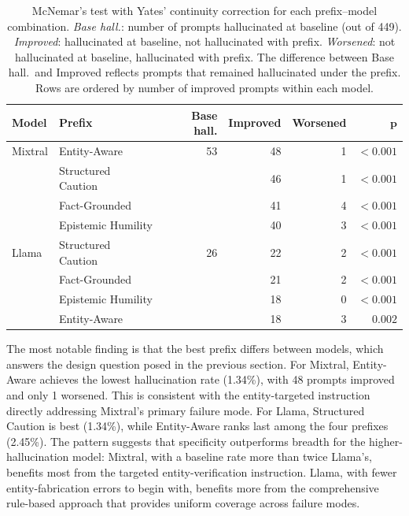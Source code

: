 \begin{table}[ht]
\centering
\small
\begin{tabular}{ll rrrr}
\toprule
\textbf{Model} & \textbf{Prefix} & \textbf{Base hall.} & \textbf{Improved} & \textbf{Worsened} & $\boldsymbol{p}$ \\
\midrule
Mixtral & Entity-Aware       & 53 & 48 & 1 & $< 0.001$ \\
        & Structured Caution &    & 46 & 1 & $< 0.001$ \\
        & Fact-Grounded      &    & 41 & 4 & $< 0.001$ \\
        & Epistemic Humility &    & 40 & 3 & $< 0.001$ \\[3pt]
Llama   & Structured Caution & 26 & 22 & 2 & $< 0.001$ \\
        & Fact-Grounded      &    & 21 & 2 & $< 0.001$ \\
        & Epistemic Humility &    & 18 & 0 & $< 0.001$ \\
        & Entity-Aware       &    & 18 & 3 & $0.002$ \\
\bottomrule
\end{tabular}
\caption[McNemar's test results for the pilot study]{McNemar's test with Yates' continuity correction for each prefix--model combination.  \emph{Base hall.}: number of prompts hallucinated at baseline (out of 449).  \emph{Improved}: hallucinated at baseline, not hallucinated with prefix.  \emph{Worsened}: not hallucinated at baseline, hallucinated with prefix.  The difference between Base hall.\ and Improved reflects prompts that remained hallucinated under the prefix.  Rows are ordered by number of improved prompts within each model.}
\label{tab:pilot-mcnemar}
\end{table}

The most notable finding is that the best prefix differs between models, which answers the design question posed in the previous section. For Mixtral, Entity-Aware achieves the lowest hallucination rate (1.34\%), with 48 prompts improved and only 1 worsened. This is consistent with the entity-targeted instruction directly addressing Mixtral's primary failure mode. For Llama, Structured Caution is best (1.34\%), while Entity-Aware ranks last among the four prefixes (2.45\%). The pattern suggests that specificity outperforms breadth for the higher-hallucination model: Mixtral, with a baseline rate more than twice Llama's, benefits most from the targeted entity-verification instruction. Llama, with fewer entity-fabrication errors to begin with, benefits more from the comprehensive rule-based approach that provides uniform coverage across failure modes.


